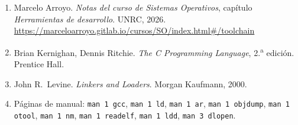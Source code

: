 \documentclass[11pt,a4paper]{article}
\begin{document}
\begin{enumerate}[leftmargin=*]
    \item Marcelo Arroyo. \emph{Notas del curso de Sistemas
        Operativos}, capítulo \emph{Herramientas de desarrollo}.
        UNRC, 2026.
        \url{https://marceloarroyo.gitlab.io/cursos/SO/index.html\#/toolchain}
    \item Brian Kernighan, Dennis Ritchie. \emph{The C Programming
        Language}, 2.\textsuperscript{a} edición. Prentice Hall.
    \item John R.\ Levine. \emph{Linkers and Loaders}. Morgan
        Kaufmann, 2000.
    \item Páginas de manual: \texttt{man 1 gcc}, \texttt{man 1 ld},
        \texttt{man 1 ar}, \texttt{man 1 objdump},
        \texttt{man 1 otool}, \texttt{man 1 nm},
        \texttt{man 1 readelf}, \texttt{man 1 ldd},
        \texttt{man 3 dlopen}.
\end{enumerate}
\end{document}
